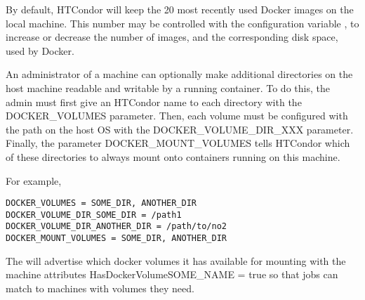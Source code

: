 By default, HTCondor will keep the 20 most recently used Docker images
on the local machine.  This number may be controlled with the configuration
variable , 
to increase or decrease the number
of images, and the corresponding disk space, used by Docker.

An administrator of a machine can optionally make additional directories
on the host machine readable and writable by a running container.
To do this, the admin must first give an HTCondor name to each directory
with the DOCKER\_VOLUMES parameter.  Then, each volume must be configured
with the path on the host OS with the DOCKER\_VOLUME\_DIR\_XXX parameter.
Finally, the parameter DOCKER\_MOUNT\_VOLUMES tells HTCondor which of
these directories to always mount onto containers running on this machine.

For example,
\begin{verbatim}
DOCKER_VOLUMES = SOME_DIR, ANOTHER_DIR
DOCKER_VOLUME_DIR_SOME_DIR = /path1
DOCKER_VOLUME_DIR_ANOTHER_DIR = /path/to/no2
DOCKER_MOUNT_VOLUMES = SOME_DIR, ANOTHER_DIR
\end{verbatim}

The  will advertise which docker volumes it has available 
for mounting with the machine attributes HasDockerVolumeSOME\_NAME = true
so that jobs can match to machines with volumes they need.

